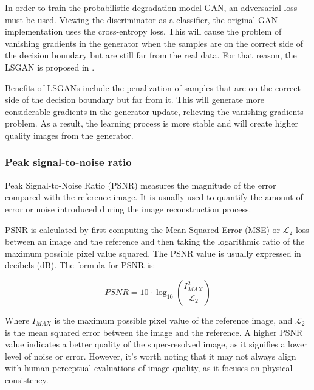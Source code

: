         In order to train the probabilistic degradation model GAN, an adversarial loss must be used. 
        Viewing the discriminator as a classifier, the original GAN implementation uses the cross-entropy loss. This will cause the problem of vanishing gradients in the generator when the samples are on the correct side of the decision boundary but are still far from the real data. For that reason, the LSGAN is proposed in \cite{mao2017squares}. 
        
        Benefits of LSGANs include the penalization of samples that are on the correct side of the decision boundary but far from it. This will generate more considerable gradients in the generator update, relieving the vanishing gradients problem. As a result, the learning process is more stable and will create higher quality images from the generator.

        

        \subsubsection{Peak signal-to-noise ratio}

         
            Peak Signal-to-Noise Ratio (PSNR) measures the magnitude of the error compared with the reference image. It is usually used to quantify the amount of error or noise introduced during the image reconstruction process.
            
            PSNR is calculated by first computing the Mean Squared Error (MSE) or $\mathcal{L}_2$ loss between an image and the reference and then taking the logarithmic ratio of the maximum possible pixel value squared. The PSNR value is usually expressed in decibels (dB). The formula for PSNR is:
            
            \begin{equation}
            PSNR = 10 \cdot \log_{10} \left( \frac{I_{MAX}^{2}}{\mathcal{L}_2} \right)
            \end{equation}
            
            Where $I_{MAX}$ is the maximum possible pixel value of the reference image, and $\mathcal{L}_2$ is the mean squared error between the image and the reference. A higher PSNR value indicates a better quality of the super-resolved image, as it signifies a lower level of noise or error. However, it's worth noting that it may not always align with human perceptual evaluations of image quality, as it focuses on physical consistency.

